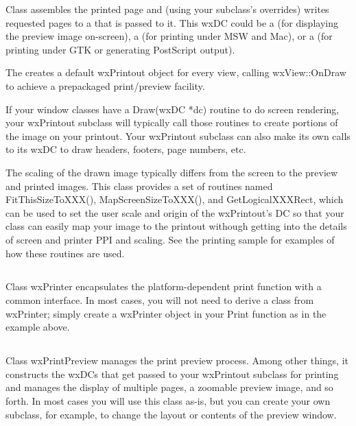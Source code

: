 Class  assembles the printed page and (using
your subclass's overrides) writes requested pages to a  that
is passed to it. This wxDC could be a  (for
displaying the preview image on-screen), a 
(for printing under MSW and Mac), or a 
(for printing under GTK or generating PostScript output).

The  creates a default
wxPrintout object for every view, calling wxView::OnDraw to achieve a
prepackaged print/preview facility.

If your window classes have a Draw(wxDC *dc) routine to do screen rendering,
your wxPrintout subclass will typically call those routines to create portions
of the image on your printout. Your wxPrintout subclass can also make its own
calls to its wxDC to draw headers, footers, page numbers, etc.

The scaling of the drawn image typically differs from the screen to the preview
and printed images. This class provides a set of routines named
FitThisSizeToXXX(), MapScreenSizeToXXX(), and GetLogicalXXXRect, which can be
used to set the user scale and origin of the wxPrintout's DC so that your class
can easily map your image to the printout withough getting into the details of
screen and printer PPI and scaling. See the printing sample for examples of how
these routines are used.

\subsection{}

Class wxPrinter encapsulates the platform-dependent print function with a common
interface. In most cases, you will not need to derive a class from wxPrinter;
simply create a wxPrinter object in your Print function as in the example above.

\subsection{}

Class wxPrintPreview manages the print preview process. Among other things, it
constructs the wxDCs that get passed to your wxPrintout subclass for printing
and manages the display of multiple pages, a zoomable preview image, and so
forth. In most cases you will use this class as-is, but you can create your own
subclass, for example, to change the layout or contents of the preview window.


